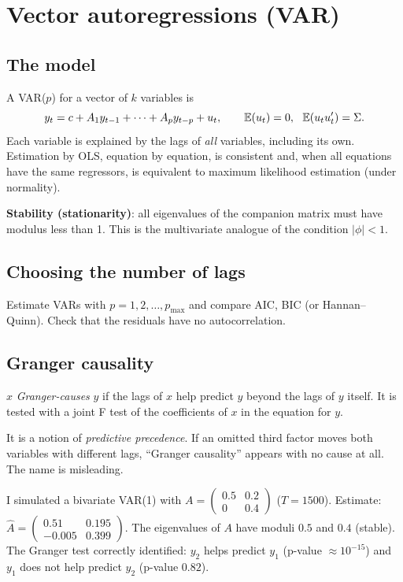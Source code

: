 \chapter{Vector autoregressions (VAR)}
\label{cap:var}

\section{The model}
A VAR($p$) for a vector of $k$ variables is
\[
y_t=c+A_1y_{t-1}+\dots+A_py_{t-p}+u_t,\qquad \mathbb{E}(u_t)=0,\ \ \mathbb{E}(u_tu_t')=\Sigma.
\]
Each variable is explained by the lags of \emph{all} variables, including its own. Estimation by OLS, equation by equation, is consistent and, when all equations have the same regressors, is equivalent to maximum likelihood estimation (under normality).

\textbf{Stability (stationarity)}: all eigenvalues of the companion matrix must have modulus less than 1. This is the multivariate analogue of the condition $|\phi|<1$.

\section{Choosing the number of lags}
Estimate VARs with $p=1,2,\dots,p_{\max}$ and compare AIC, BIC (or Hannan--Quinn). Check that the residuals have no autocorrelation.

\section{Granger causality}
$x$ \emph{Granger-causes} $y$ if the lags of $x$ help predict $y$ beyond the lags of $y$ itself. It is tested with a joint F test of the coefficients of $x$ in the equation for $y$.

\begin{atencao}
It is a notion of \emph{predictive precedence}. If an omitted third factor moves both variables with different lags, ``Granger causality'' appears with no cause at all. The name is misleading.
\end{atencao}

\begin{simulacao}
I simulated a bivariate VAR(1) with $A=\begin{pmatrix}0.5&0.2\\0&0.4\end{pmatrix}$ ($T=1500$). Estimate: $\hat A=\begin{pmatrix}0.51&0.195\\-0.005&0.399\end{pmatrix}$. The eigenvalues of $A$ have moduli $0.5$ and $0.4$ (stable). The Granger test correctly identified: $y_2$ helps predict $y_1$ (p-value $\approx10^{-15}$) and $y_1$ does not help predict $y_2$ (p-value $0.82$).
\end{simulacao}

